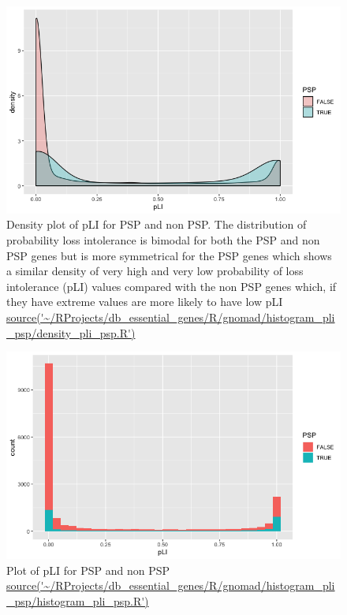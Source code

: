 \begin{figure}
    \centering
    \includegraphics[width=\textwidth]{images/chapter3/ggplot2/gnomad/Rplot_density_plot.png}
    \caption{Density plot of pLI for PSP and non PSP. The distribution of probability loss intolerance is bimodal for both the PSP and non PSP genes but is more symmetrical for the PSP genes which shows a similar density of very high and very low probability of loss intolerance (pLI) values compared with the non PSP genes which, if they have extreme values are more likely to have low pLI  \url{source('~/RProjects/db_essential_genes/R/gnomad/histogram_pli_psp/density_pli_psp.R')}}
    \label{fig:densityPLI}
\end{figure}

\begin{figure}



    \centering
    \includegraphics[width=\textwidth]{images/chapter3/ggplot2/gnomad/Rplot_PSP_gnomad.png}
    \caption{Plot of pLI for PSP and non PSP \url{source('~/RProjects/db_essential_genes/R/gnomad/histogram_pli_psp/histogram_pli_psp.R')}}
    \label{fig:hist_pliPSP}
\end{figure}
